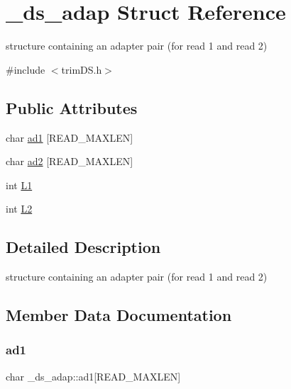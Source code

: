\hypertarget{struct__ds__adap}{}\section{\+\_\+ds\+\_\+adap Struct Reference}
\label{struct__ds__adap}


structure containing an adapter pair (for read 1 and read 2)  




{\ttfamily \#include $<$trim\+D\+S.\+h$>$}

\subsection*{Public Attributes}
\begin{DoxyCompactItemize}
\item 
char \mbox{\hyperlink{struct__ds__adap_ae14dd70536b6c7e795261cafad1c2d72}{ad1}} \mbox{[}R\+E\+A\+D\+\_\+\+M\+A\+X\+L\+EN\mbox{]}
\item 
char \mbox{\hyperlink{struct__ds__adap_a6206cafdf0cfea58ce84c08515def558}{ad2}} \mbox{[}R\+E\+A\+D\+\_\+\+M\+A\+X\+L\+EN\mbox{]}
\item 
int \mbox{\hyperlink{struct__ds__adap_a57266ed9fb1b73a20f98b8df2235f0c8}{L1}}
\item 
int \mbox{\hyperlink{struct__ds__adap_a80926b243dd1120a43bd9b8e00774b99}{L2}}
\end{DoxyCompactItemize}


\subsection{Detailed Description}
structure containing an adapter pair (for read 1 and read 2) 

\subsection{Member Data Documentation}
\mbox{\label{struct__ds__adap_ae14dd70536b6c7e795261cafad1c2d72}} 
\subsubsection{\texorpdfstring{ad1}{ad1}}
{\footnotesize\ttfamily char \+\_\+ds\+\_\+adap\+::ad1\mbox{[}R\+E\+A\+D\+\_\+\+M\+A\+X\+L\+EN\mbox{]}}

